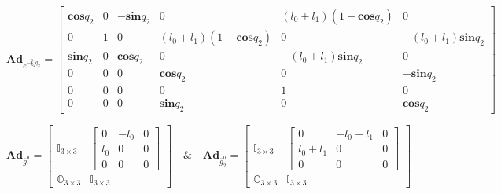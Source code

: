 \documentclass[lettersize,journal]{IEEEtran}
\def \Ad {\textbf{Ad}}
\def \sin {\textbf{sin}}
\def \cos {\textbf{cos}}
\theoremstyle{remark}
\begin{document}
\begin{strip}
\begin{equation*}
    \Ad_{e^{-\hat{\xi}_2q_2}}=\begin{bmatrix}\cos q_2 & 0 & -\sin q_2 & 0 & (l_0+l_1)(1-\cos q_2) & 0\\0 &1 & 0 & (l_0+l_1)(1-\cos q_2) & 0 & -(l_0+l_1)\sin q_2 \\ \sin q_2 & 0  & \cos q_2 & 0 &-(l_0+l_1)\sin q_2 & 0\\ 0 & 0 & 0& 
    \cos q_2 & 0 & -\sin q_2 \\0 & 0 & 0& 0 & 1 & 0 \\0 & 0 & 0& \sin q_2 & 0 & \cos q_2
    \end{bmatrix}
\end{equation*}

\begin{equation*}
    \Ad_{\bar{g}^0_1}=\begin{bmatrix}
    \mathbb{I}_{3\times 3} &\begin{bmatrix}
    0 &-l_0& 0\\l_0& 0& 0\\0 & 0 & 0\end{bmatrix}\\ \mathbb{O}_{3\times 3} & \mathbb{I}_{3\times 3}
    \end{bmatrix}
\quad \& \quad
    \Ad_{\bar{g}^0_2}=\begin{bmatrix}
    \mathbb{I}_{3\times 3} &\begin{bmatrix}
    0 &-l_0-l_1& 0\\l_0+l_1& 0& 0\\0 & 0 & 0\end{bmatrix}\\ \mathbb{O}_{3\times 3} & \mathbb{I}_{3\times 3}
    \end{bmatrix}
\end{equation*}

\end{strip}
\end{document}
